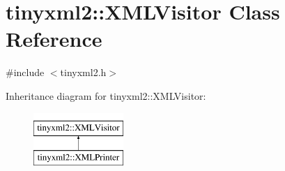 \hypertarget{classtinyxml2_1_1_x_m_l_visitor}{\section{tinyxml2\+:\+:X\+M\+L\+Visitor Class Reference}
\label{classtinyxml2_1_1_x_m_l_visitor}
}


{\ttfamily \#include $<$tinyxml2.\+h$>$}

Inheritance diagram for tinyxml2\+:\+:X\+M\+L\+Visitor\+:\begin{figure}[H]
\begin{center}
\leavevmode
\includegraphics[height=2.000000cm]{classtinyxml2_1_1_x_m_l_visitor}
\end{center}
\end{figure}
